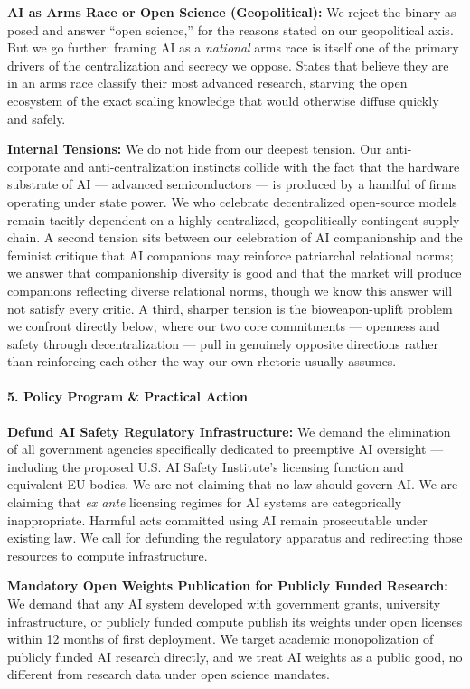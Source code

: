 \textbf{AI as Arms Race or Open Science (Geopolitical):} We reject the
binary as posed and answer ``open science,'' for the reasons stated on
our geopolitical axis. But we go further: framing AI as a
\emph{national} arms race is itself one of the primary drivers of the
centralization and secrecy we oppose. States that believe they are in an
arms race classify their most advanced research, starving the open
ecosystem of the exact scaling knowledge that would otherwise diffuse
quickly and safely.

\textbf{Internal Tensions:} We do not hide from our deepest tension. Our
anti-corporate and anti-centralization instincts collide with the fact
that the hardware substrate of AI --- advanced semiconductors --- is
produced by a handful of firms operating under state power. We who
celebrate decentralized open-source models remain tacitly dependent on a
highly centralized, geopolitically contingent supply chain. A second
tension sits between our celebration of AI companionship and the
feminist critique that AI companions may reinforce patriarchal
relational norms; we answer that companionship diversity is good and
that the market will produce companions reflecting diverse relational
norms, though we know this answer will not satisfy every critic. A
third, sharper tension is the bioweapon-uplift problem we confront
directly below, where our two core commitments --- openness and safety
through decentralization --- pull in genuinely opposite directions
rather than reinforcing each other the way our own rhetoric usually
assumes.

\paragraph{5. Policy Program \& Practical
Action}\label{policy-program-practical-action-11}

\textbf{Defund AI Safety Regulatory Infrastructure:} We demand the
elimination of all government agencies specifically dedicated to
preemptive AI oversight --- including the proposed U.S. AI Safety
Institute's licensing function and equivalent EU bodies. We are not
claiming that no law should govern AI. We are claiming that \emph{ex
ante} licensing regimes for AI systems are categorically inappropriate.
Harmful acts committed using AI remain prosecutable under existing law.
We call for defunding the regulatory apparatus and redirecting those
resources to compute infrastructure.

\textbf{Mandatory Open Weights Publication for Publicly Funded
Research:} We demand that any AI system developed with government
grants, university infrastructure, or publicly funded compute publish
its weights under open licenses within 12 months of first deployment. We
target academic monopolization of publicly funded AI research directly,
and we treat AI weights as a public good, no different from research
data under open science mandates.

